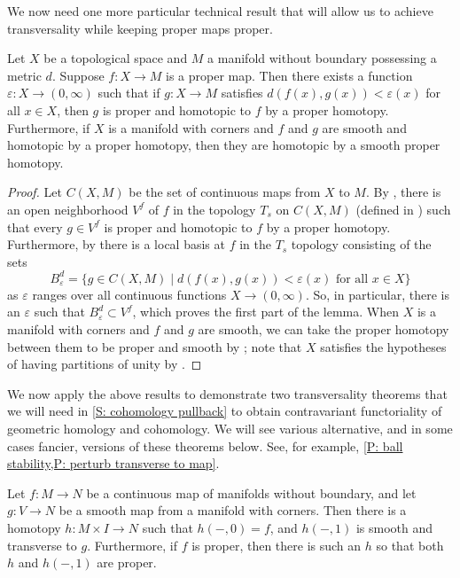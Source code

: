 We now need one more particular technical result that will allow us to achieve transversality while keeping proper maps proper.

\begin{lemma}\label{L: nearby proper homotopy}
	Let $X$ be a topological space and $M$ a manifold without boundary possessing a metric $d$.
	Suppose $f \colon X \to M$ is a proper map.
	Then there exists a function $\varepsilon \colon X \to (0,\infty)$ such that if $g \colon X \to M$ satisfies $d(f(x),g(x)) < \varepsilon(x)$ for all $x \in X$, then $g$ is proper and homotopic to $f$ by a proper homotopy.
	Furthermore, if $X$ is a manifold with corners and $f$ and $g$ are smooth and homotopic by a proper homotopy, then they are homotopic by a smooth proper homotopy.
\end{lemma}

\begin{proof}
	Let $C(X,M)$ be the set of continuous maps from $X$ to $M$.
	By \cite[Proposition 9.2.28]{MaDo92}, there is an open neighborhood $V^f$ of $f$ in the topology $T_s$ on $C(X,M)$ (defined in \cite[Proposition 9.2.1]{MaDo92}) such that every $g \in V^f$ is proper and homotopic to $f$ by a proper homotopy.
	Furthermore, by \cite[Proposition 9.3.9]{MaDo92} there is a local basis at $f$ in the $T_s$ topology consisting of the sets
	$$B_\varepsilon^d = \{g \in C(X,M) \mid d(f(x),g(x)) < \varepsilon (x) \text{ for all } x \in X\}$$
	as $\varepsilon$ ranges over all continuous functions $X \to (0,\infty)$.
	So, in particular, there is an $\varepsilon$ such that $B_\varepsilon^d \subset V^f$, which proves the first part of the lemma.
	When $X$ is a manifold with corners and $f$ and $g$ are smooth, we can take the proper homotopy between them to be proper and smooth by \cite[Proposition 9.2.35]{MaDo92}; note that $X$ satisfies the hypotheses of having partitions of unity by \cite[Corollary 1.5.14]{MaDo92}.
\end{proof}


We now apply the above results to demonstrate two transversality theorems that we will need in \cref{S: cohomology pullback} to obtain contravariant functoriality of geometric homology and cohomology.
We will see various alternative, and in some cases fancier, versions of these theorems below.
See, for example, \cref{P: ball stability,P: perturb transverse to map}.

\begin{theorem}\label{T: basic trans}
	Let $f \colon M \to N$ be a continuous map of manifolds without boundary, and let $g \colon V \to N$ be a smooth map from a manifold with corners.
	Then there is a homotopy $h \colon M \times I \to N$ such that $h(-,0) = f$, and $h(-,1)$ is smooth and transverse to $g$.
	Furthermore, if $f$ is proper, then there is such an $h$ so that both $h$ and $h(-,1)$ are proper.
\end{theorem}

